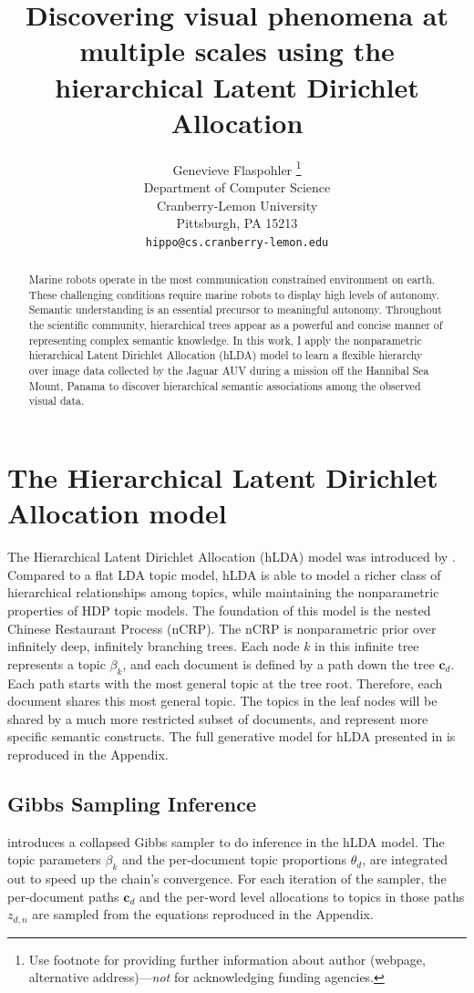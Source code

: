 \documentclass{article}
\title{Discovering visual phenomena at multiple scales using the hierarchical Latent Dirichlet Allocation}
\author{
  Genevieve Flaspohler \thanks{Use footnote for providing further
    information about author (webpage, alternative
    address)---\emph{not} for acknowledging funding agencies.} \\
  Department of Computer Science\\
  Cranberry-Lemon University\\
  Pittsburgh, PA 15213 \\
  \texttt{hippo@cs.cranberry-lemon.edu} \\
}
\begin{document}
\maketitle

\begin{abstract}
Marine robots operate in the most communication constrained environment on earth. These challenging conditions require marine robots to display high levels of autonomy. Semantic understanding is an essential precursor to meaningful autonomy. Throughout the scientific community, hierarchical trees appear as a powerful and concise manner of representing complex semantic knowledge. In this work, I apply the nonparametric hierarchical Latent Dirichlet Allocation (hLDA) model to learn a flexible hierarchy over image data collected by the Jaguar AUV during a mission off the Hannibal Sea Mount, Panama to discover hierarchical semantic associations among the observed visual data. 
\end{abstract}

\section{The Hierarchical Latent Dirichlet Allocation model}
  The Hierarchical Latent Dirichlet Allocation (hLDA) model was introduced by \citet{Blei2010}. Compared to a flat LDA topic model, hLDA is able to model a richer class of hierarchical relationships among topics, while maintaining the nonparametric properties of HDP topic models. The foundation of this model is the nested Chinese Restaurant Process (nCRP). The nCRP is nonparametric prior over infinitely deep, infinitely branching trees. Each node $k$ in this infinite tree represents a topic $\beta_k$, and each document is defined by a path down the tree $\mathbf{c}_d$. Each path starts with the most general topic at the tree root. Therefore, each document shares this most general topic. The topics in the leaf nodes will be shared by a much more restricted subset of documents, and represent more specific semantic constructs. The full generative model for hLDA presented in \citet{Blei2010} is reproduced in the Appendix.

\subsection{Gibbs Sampling Inference}
\citet{Blei2010} introduces a collapsed Gibbs sampler to do inference in the hLDA model. The topic parameters $\beta_k$ and the per-document topic proportions $\theta_d$, are integrated out to speed up the chain's convergence. For each iteration of the sampler, the per-document paths $\mathbf{c}_d$ and the per-word level allocations to topics in those paths $z_{d,n}$ are sampled from the equations reproduced in the Appendix. 
\end{document}
